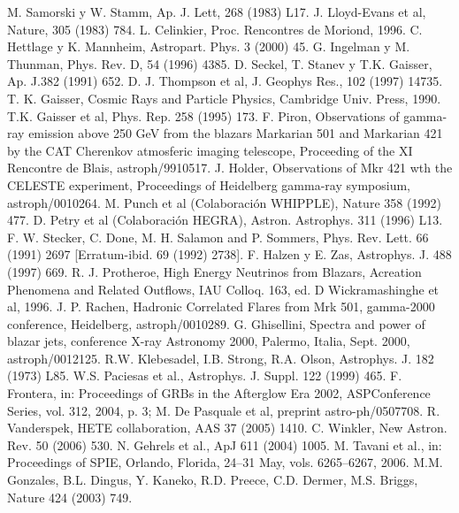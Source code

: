 \begin{thebibliography}{1}
 M. Samorski y W. Stamm, Ap. J. Lett, 268 (1983) L17.
 J. Lloyd-Evans et al, Nature, 305 (1983) 784.
 L. Celinkier, Proc. Rencontres de Moriond, 1996.
 C. Hettlage y K. Mannheim, Astropart. Phys. 3 (2000) 45.
 G. Ingelman y M. Thunman, Phys. Rev. D, 54 (1996) 4385.
 D. Seckel, T. Stanev y T.K. Gaisser, Ap. J.382 (1991) 652.
 D. J. Thompson et al, J. Geophys Res., 102 (1997) 14735.
 T. K. Gaisser, Cosmic Rays and Particle Physics, Cambridge Univ. Press, 1990.
 T.K. Gaisser et al, Phys. Rep. 258 (1995) 173.
 F. Piron, Observations of gamma-ray emission above 250 GeV from the blazars Markarian 501 and Markarian 421 by the CAT Cherenkov atmosferic imaging telescope, Proceeding of the XI Rencontre de Blais, astroph/9910517.
 J. Holder, Observations of Mkr 421 wth the CELESTE experiment, Proceedings of Heidelberg gamma-ray symposium, astroph/0010264.
 M. Punch et al (Colaboración WHIPPLE), Nature 358 (1992) 477.
 D. Petry et al (Colaboración HEGRA), Astron. Astrophys. 311 (1996) L13.
 F. W. Stecker, C. Done, M. H. Salamon and P. Sommers, Phys. Rev. Lett. 66 (1991) 2697 [Erratum-ibid. 69 (1992) 2738].
 F. Halzen y E. Zas, Astrophys. J. 488 (1997) 669.
 R. J. Protheroe, High Energy Neutrinos from Blazars, Acreation Phenomena and Related Outflows, IAU Colloq. 163, ed. D Wickramashinghe et al, 1996. 
 J. P. Rachen, Hadronic Correlated Flares from Mrk 501, gamma-2000 conference, Heidelberg, astroph/0010289.
 G. Ghisellini, Spectra and power of blazar jets, conference X-ray Astronomy 2000, Palermo, Italia, Sept. 2000, astroph/0012125.
 R.W. Klebesadel, I.B. Strong, R.A. Olson, Astrophys. J. 182 (1973) L85.
 W.S. Paciesas et al., Astrophys. J. Suppl. 122 (1999) 465.
 F. Frontera, in: Proceedings of GRBs in the Afterglow Era 2002, ASPConference Series, vol. 312, 2004, p. 3; M. De Pasquale et al, preprint astro-ph/0507708.
 R. Vanderspek, HETE collaboration, AAS 37 (2005) 1410.
 C. Winkler, New Astron. Rev. 50 (2006) 530.
 N. Gehrels et al., ApJ 611 (2004) 1005.
 M. Tavani et al., in: Proceedings of SPIE, Orlando, Florida, 24–31 May, vols. 6265–6267, 2006.
 M.M. Gonzales, B.L. Dingus, Y. Kaneko, R.D. Preece, C.D. Dermer, M.S. Briggs, Nature 424 (2003) 749.

\end{thebibliography}
